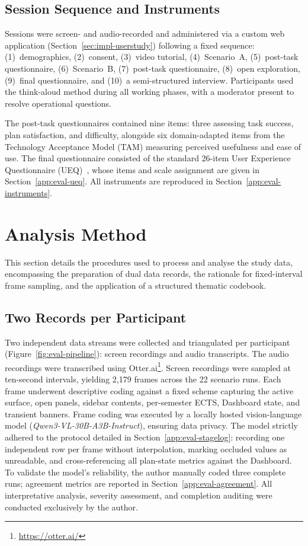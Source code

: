 \subsection{Session Sequence and Instruments}
\label{sec:eval-sequence}

Sessions were screen- and audio-recorded and administered via a custom web application (Section~\ref{sec:impl-userstudy}) following a fixed sequence: (1)~demographics, (2)~consent, (3)~video tutorial, (4)~Scenario~A, (5)~post-task questionnaire, (6)~Scenario~B, (7)~post-task questionnaire, (8)~open exploration, (9)~final questionnaire, and (10)~a semi-structured interview. Participants used the think-aloud method during all working phases, with a moderator present to resolve operational questions.

The post-task questionnaires contained nine items: three assessing task success, plan satisfaction, and difficulty, alongside six domain-adapted items from the Technology Acceptance Model (TAM) measuring perceived usefulness and ease of use. The final questionnaire consisted of the standard 26-item User Experience Questionnaire (UEQ)~\cite{laugwitz_construction_2008}, whose items and scale assignment are given in Section~\ref{app:eval-ueq}. All instruments are reproduced in Section~\ref{app:eval-instruments}.

\section{Analysis Method}
\label{sec:eval-analysis}

This section details the procedures used to process and analyse the study data, encompassing the preparation of dual data records, the rationale for fixed-interval frame sampling, and the application of a structured thematic codebook.

\subsection{Two Records per Participant}
\label{sec:eval-tworecords}

Two independent data streams were collected and triangulated per participant (Figure~\ref{fig:eval-pipeline}): screen recordings and audio transcripts. The audio recordings were transcribed using Otter.ai\footnote{\url{https://otter.ai/}}. Screen recordings were sampled at ten-second intervals, yielding 2{,}179 frames across the 22 scenario runs. Each frame underwent descriptive coding against a fixed scheme capturing the active surface, open panels, sidebar contents, per-semester ECTS, Dashboard state, and transient banners. Frame coding was executed by a locally hosted vision-language model (\emph{Qwen3-VL-30B-A3B-Instruct}), ensuring data privacy. The model strictly adhered to the protocol detailed in Section~\ref{app:eval-stagelog}: recording one independent row per frame without interpolation, marking occluded values as unreadable, and cross-referencing all plan-state metrics against the Dashboard. To validate the model's reliability, the author manually coded three complete runs; agreement metrics are reported in Section~\ref{app:eval-agreement}. All interpretative analysis, severity assessment, and completion auditing were conducted exclusively by the author.

